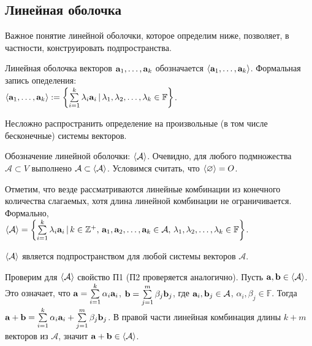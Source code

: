 \subsection{Линейная оболочка}

Важное понятие линейной оболочки, которое определим ниже, 
 позволяет, в частности, конструировать подпространства.


Линейная оболочка векторов $\mathbf{a}_1, \ldots, \mathbf{a}_k$ обозначается  $\langle \mathbf{a}_1, \ldots, \mathbf{a}_k \rangle$.
Формальная запись опеделения: \\
$\langle \mathbf{a}_1, \ldots, \mathbf{a}_k \rangle : = \left\{ \sum\limits_{i=1}^{k} \lambda_i \mathbf{a}_i \, | \,
 \lambda_1, \lambda_2, \ldots , \lambda_k \in \mathbb{F} \right\}$.

Несложно распространить определение на произвольные (в том числе бесконечные) системы векторов.


Обозначение линейной оболочки: $\langle \mathcal{A} \rangle$. Очевидно, для любого подмножества
$\mathcal{A}\subset V$ выполнено $\mathcal{A}\subset \langle \mathcal{A} \rangle$.
Условимся считать, что $\langle \varnothing \rangle = O$.

Отметим, что везде рассматриваются линейные комбинации из конечного 
количества слагаемых, хотя длина линейной комбинации не ограничивается.
Формально, \\
$\langle \mathcal{A} \rangle = \left\{ \sum\limits_{i=1}^{k} \lambda_i \mathbf{a}_i \, | \,
k\in \mathbb{Z}^+, \, \mathbf{a}_1, \mathbf{a}_2, \ldots , \mathbf{a}_k \in \mathcal{A},
\, \lambda_1, \lambda_2, \ldots , \lambda_k \in \mathbb{F}\right\}$.


\begin{predl}\label{lin_ob}
$\langle \mathcal{A} \rangle$ является подпространством
для любой системы векторов $\mathcal{A}$.
\end{predl}
\dok Проверим для $\langle \mathcal{A} \rangle$ свойство П1 (П2 проверяется аналогично). 
Пусть $\mathbf{a}, \mathbf{b} \in \langle \mathcal{A} \rangle$. Это означает, что 
$\mathbf{a} = \sum\limits_{i=1}^{k} \alpha_i \mathbf{a}_i$, $\mathbf{b} = \sum\limits_{j=1}^{m} \beta_j \mathbf{b}_j$, 
где $\mathbf{a}_i, \mathbf{b}_j \in \mathcal{A}$, $\alpha_i, \beta_j \in \mathbb{F}$. Тогда 
$\mathbf{a} + \mathbf{b}= \sum\limits_{i=1}^{k} \alpha_i \mathbf{a}_i+ \sum\limits_{j=1}^{m} \beta_j \mathbf{b}_j$.
В правой части линейная комбинация длины $k+m$ векторов из $\mathcal{A}$, значит 
$\mathbf{a} + \mathbf{b}\in \langle \mathcal{A} \rangle$.
\edok

